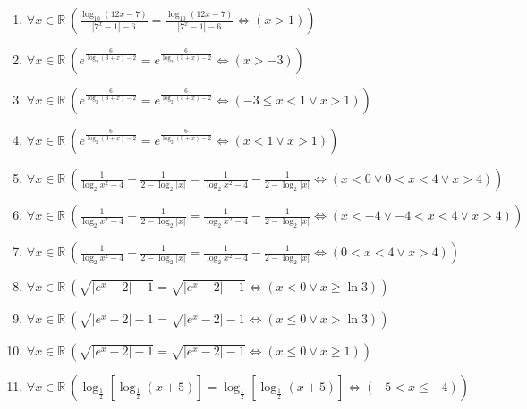 \documentclass[11pt,a4paper]{article}
\begin{document}
\begin{enumerate}
\item $\displaystyle \forall x \in \mathbb{R}\ \left( \frac{\log_{10}(12x - 7)}{\left| 7^{x} - 1 \right| - 6} = \frac{\log_{10}(12x - 7)}{\left| 7^{x} - 1 \right| - 6} \iff \left( x > 1 \right) \right)$
\item $\displaystyle \forall x \in \mathbb{R}\ \left( e^{\frac{6}{\log_{2}(3 + x) - 2}} = e^{\frac{6}{\log_{2}(3 + x) - 2}} \iff \left( x > -3 \right) \right)$
\item $\displaystyle \forall x \in \mathbb{R}\ \left( e^{\frac{6}{\log_{2}(3 + x) - 2}} = e^{\frac{6}{\log_{2}(3 + x) - 2}} \iff \left( -3 \le x < 1 \lor x > 1 \right) \right)$
\item $\displaystyle \forall x \in \mathbb{R}\ \left( e^{\frac{6}{\log_{2}(3 + x) - 2}} = e^{\frac{6}{\log_{2}(3 + x) - 2}} \iff \left( x < 1 \lor x > 1 \right) \right)$
\item $\displaystyle \forall x \in \mathbb{R}\ \left( \frac{1}{\log_{2} x^{2} - 4} - \frac{1}{2 - \log_{2}\left| x \right|} = \frac{1}{\log_{2} x^{2} - 4} - \frac{1}{2 - \log_{2}\left| x \right|} \iff \left( x < 0 \lor 0 < x < 4 \lor x > 4 \right) \right)$
\item $\displaystyle \forall x \in \mathbb{R}\ \left( \frac{1}{\log_{2} x^{2} - 4} - \frac{1}{2 - \log_{2}\left| x \right|} = \frac{1}{\log_{2} x^{2} - 4} - \frac{1}{2 - \log_{2}\left| x \right|} \iff \left( x < -4 \lor -4 < x < 4 \lor x > 4 \right) \right)$
\item $\displaystyle \forall x \in \mathbb{R}\ \left( \frac{1}{\log_{2} x^{2} - 4} - \frac{1}{2 - \log_{2}\left| x \right|} = \frac{1}{\log_{2} x^{2} - 4} - \frac{1}{2 - \log_{2}\left| x \right|} \iff \left( 0 < x < 4 \lor x > 4 \right) \right)$
\item $\displaystyle \forall x \in \mathbb{R}\ \left( \sqrt{\left| e^{x} - 2 \right| - 1} = \sqrt{\left| e^{x} - 2 \right| - 1} \iff \left( x < 0 \lor x \ge \ln 3 \right) \right)$
\item $\displaystyle \forall x \in \mathbb{R}\ \left( \sqrt{\left| e^{x} - 2 \right| - 1} = \sqrt{\left| e^{x} - 2 \right| - 1} \iff \left( x \le 0 \lor x > \ln 3 \right) \right)$
\item $\displaystyle \forall x \in \mathbb{R}\ \left( \sqrt{\left| e^{x} - 2 \right| - 1} = \sqrt{\left| e^{x} - 2 \right| - 1} \iff \left( x \le 0 \lor x \ge 1 \right) \right)$
\item $\displaystyle \forall x \in \mathbb{R}\ \left( \log_{\frac{1}{2}}\left[\log_{\frac{1}{2}}(x + 5)\right] = \log_{\frac{1}{2}}\left[\log_{\frac{1}{2}}(x + 5)\right] \iff \left( -5 < x \le -4 \right) \right)$

\end{enumerate}
\end{document}
